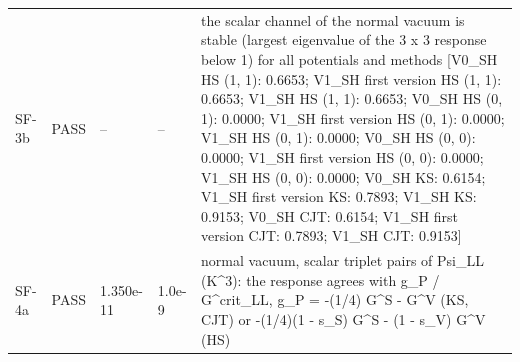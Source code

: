 \documentclass[aps,prd,onecolumn,superscriptaddress,nofootinbib,floatfix,longbibliography]{revtex4-2}
\begin{document}
\begin{longtable}{p{}p{}p{}p{}p{}}
SF-3b & PASS & -- & -- & the scalar channel of the normal vacuum is stable (largest eigenvalue of the 3 x 3 response below 1) for all potentials and methods [V0\_SH HS (1, 1): 0.6653; V1\_SH first version HS (1, 1): 0.6653; V1\_SH HS (1, 1): 0.6653; V0\_SH HS (0, 1): 0.0000; V1\_SH first version HS (0, 1): 0.0000; V1\_SH HS (0, 1): 0.0000; V0\_SH HS (0, 0): 0.0000; V1\_SH first version HS (0, 0): 0.0000; V1\_SH HS (0, 0): 0.0000; V0\_SH KS: 0.6154; V1\_SH first version KS: 0.7893; V1\_SH KS: 0.9153; V0\_SH CJT: 0.6154; V1\_SH first version CJT: 0.7893; V1\_SH CJT: 0.9153] \\
SF-4a & PASS & 1.350e-11 & 1.0e-9 & normal vacuum, scalar triplet pairs of Psi\_LL (K\textasciicircum{}3): the response agrees with g\_P / G\textasciicircum{}crit\_LL, g\_P = -(1/4) G\textasciicircum{}S - G\textasciicircum{}V (KS, CJT) or -(1/4)(1 - s\_S) G\textasciicircum{}S - (1 - s\_V) G\textasciicircum{}V (HS) \\

\end{longtable}
\end{document}
